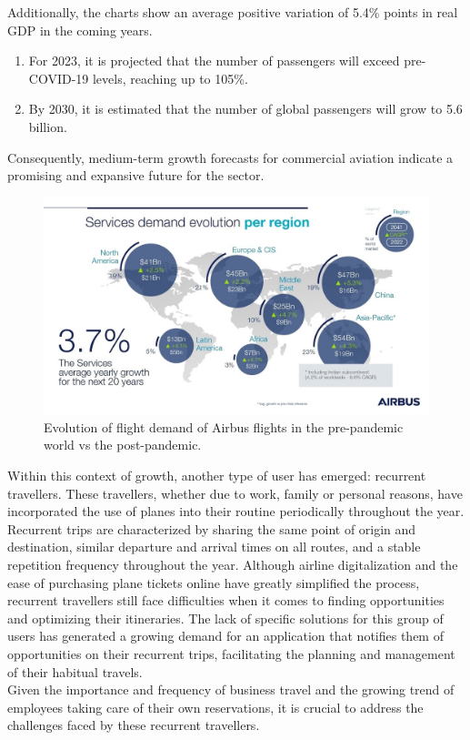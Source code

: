 \documentclass[../memory.tex]{subfiles}
\begin{document}
Additionally, the charts show an average positive variation of 5.4\% points in
real GDP in the coming years.
\begin{enumerate}[label = -]
	\item For 2023, it is projected that the number of passengers will exceed
	      pre-COVID-19 levels, reaching up to 105\%.
	\item By 2030, it is estimated that the number of global passengers will grow
	      to 5.6 billion.
\end{enumerate}
Consequently, medium-term growth forecasts for commercial aviation indicate a
promising and expansive future for the sector.
\begin{figure}[H]
	\centering
	\includegraphics[width=\textwidth]{./assets/airbus-service-demand.png}
	\caption{Evolution of flight demand of Airbus flights in the pre-pandemic
		world vs the post-pandemic.}
\end{figure}
Within this context of growth, another type of user has emerged: recurrent
travellers. These travellers, whether due to work, family or personal reasons,
have incorporated the use of planes into their routine periodically throughout
the year.
\\[8pt]
Recurrent trips are characterized by sharing the same point of origin and
destination, similar departure and arrival times on all routes, and a stable
repetition frequency throughout the year. Although airline digitalization and
the ease of purchasing plane tickets online have greatly simplified the process,
recurrent travellers still face difficulties when it comes to finding
opportunities and optimizing their itineraries. The lack of specific solutions
for this group of users has generated a growing demand for an application that
notifies them of opportunities on their recurrent trips, facilitating the
planning and management of their habitual travels.
\\[8pt]
Given the importance and frequency of business travel and the growing trend of
employees taking care of their own reservations, it is crucial to address the
challenges faced by these recurrent travellers.
\end{document}

